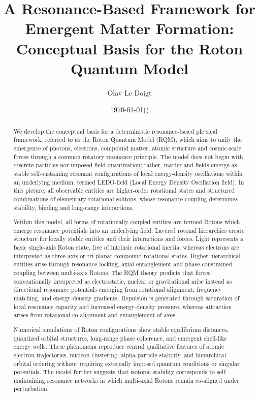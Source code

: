 \documentclass[11pt,a4paper]{article}
\title{A Resonance-Based Framework for Emergent Matter Formation:\\
Conceptual Basis for the Roton Quantum Model}
\author{Olav Le Doigt}
\date{\today\;\;(\paperversion)}
\begin{document}
\maketitle


\begin{abstract}
We develop the conceptual basis for a deterministic resonance-based physical framework, referred to as the Roton Quantum Model (RQM), which aims to unify the emergence of photons, electrons, compound matter, atomic structure and cosmic-scale forces through a common rotatory resonance principle. The model does not begin with discrete particles nor imposed field quantization; rather, matter and fields emerge as stable self-sustaining resonant configurations of local energy-density oscillations within an underlying medium, termed LEDO-field (Local Energy Density Oscillation field). In this picture, all observable entities are higher-order rotational states and structured combinations of elementary rotational solitons, whose resonance coupling determines stability, binding and long-range interactions.

Within this model, all forms of rotationally coupled entities are termed Rotons which emerge resonance potentials into an underlying field. Layered rotonal hierarchies create structure for locally stable entities and their interactions and forces. Light represents a basic single-axis Roton state, free of intrinsic rotational inertia, whereas electrons are interpreted as three-axis or tri-planar compound rotational states. Higher hierarchical entities arise through resonance locking, axial entanglement and phase-constrained coupling between multi-axis Rotons. The RQM theory predicts that forces conventionally interpreted as electrostatic, nuclear or gravitational arise instead as directional resonance potentials emerging from rotational alignment, frequency matching, and energy-density gradients. Repulsion is generated through saturation of local resonance capacity and increased energy-density pressure, whereas attraction arises from rotational co-alignment and entanglement of axes.

Numerical simulations of Roton configurations show stable equilibrium distances, quantized orbital structures, long-range phase coherence, and emergent shell-like energy wells. These phenomena reproduce central qualitative features of atomic electron trajectories, nucleon clustering, alpha-particle stability, and hierarchical orbital ordering without requiring externally imposed quantum conditions or singular potentials. The model further suggests that isotopic stability corresponds to self-maintaining resonance networks in which multi-axial Rotons remain co-aligned under perturbation.


\end{abstract}
\end{document}
